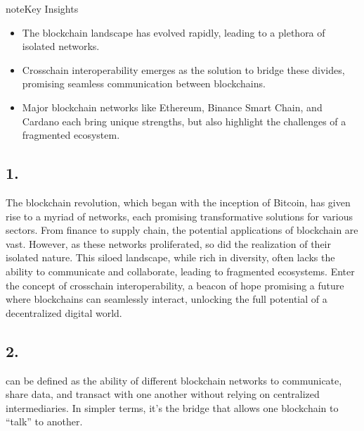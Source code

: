 \documentclass[letterpaper,10pt,english]{jupyterBook}
\begin{document}
\begin{sphinxadmonition}{note}{Key Insights}
\begin{itemize}
\item {} 
\sphinxAtStartPar
The blockchain landscape has evolved rapidly, leading to a plethora of isolated networks.

\item {} 
\sphinxAtStartPar
Cross\sphinxhyphen{}chain interoperability emerges as the solution to bridge these divides, promising seamless communication between blockchains.

\item {} 
\sphinxAtStartPar
Major blockchain networks like Ethereum, Binance Smart Chain, and Cardano each bring unique strengths, but also highlight the challenges of a fragmented ecosystem.

\end{itemize}
\end{sphinxadmonition}


\subsection{1. }
\label{\detokenize{Interoperability/Cross-Chain Interoperability:introduction}}
\sphinxAtStartPar
The blockchain revolution, which began with the inception of Bitcoin, has given rise to a myriad of networks, each promising transformative solutions for various sectors. From finance to supply chain, the potential applications of blockchain are vast. However, as these networks proliferated, so did the realization of their isolated nature. This siloed landscape, while rich in diversity, often lacks the ability to communicate and collaborate, leading to fragmented ecosystems. Enter the concept of cross\sphinxhyphen{}chain interoperability, a beacon of hope promising a future where blockchains can seamlessly interact, unlocking the full potential of a decentralized digital world.

\begin{figure}[htbp]
\centering

\noindent{}
\end{figure}


\subsection{2. }
\label{\detokenize{Interoperability/Cross-Chain Interoperability:definition-and-importance-of-cross-chain-interoperability}}
\sphinxAtStartPar
{} can be defined as the ability of different blockchain networks to communicate, share data, and transact with one another without relying on centralized intermediaries. In simpler terms, it’s the bridge that allows one blockchain to “talk” to another.
\end{document}
